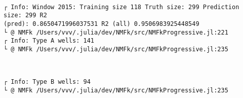 \documentclass[11pt]{article}
\begin{document}
    \begin{center}
    \end{center}
    { \hspace*{\fill} \\}
    
    \begin{Verbatim}[commandchars=\\\{\}]

    \end{Verbatim}

    \begin{center}
    \end{center}
    { \hspace*{\fill} \\}
    
    \begin{center}
    \end{center}
    { \hspace*{\fill} \\}
    
    \begin{Verbatim}[commandchars=\\\{\}]
┌ Info: Window 2015: Training size 118 Truth size: 299 Prediction size: 299 R2
(pred): 0.8650471996037531 R2 (all) 0.9506983925448549
└ @ NMFk /Users/vvv/.julia/dev/NMFk/src/NMFkProgressive.jl:221
┌ Info: Type A wells: 141
└ @ NMFk /Users/vvv/.julia/dev/NMFk/src/NMFkProgressive.jl:235
    \end{Verbatim}

    \begin{center}
    \end{center}
    { \hspace*{\fill} \\}
    
    \begin{Verbatim}[commandchars=\\\{\}]
┌ Info: Type B wells: 94
└ @ NMFk /Users/vvv/.julia/dev/NMFk/src/NMFkProgressive.jl:235
    \end{Verbatim}
\end{document}
